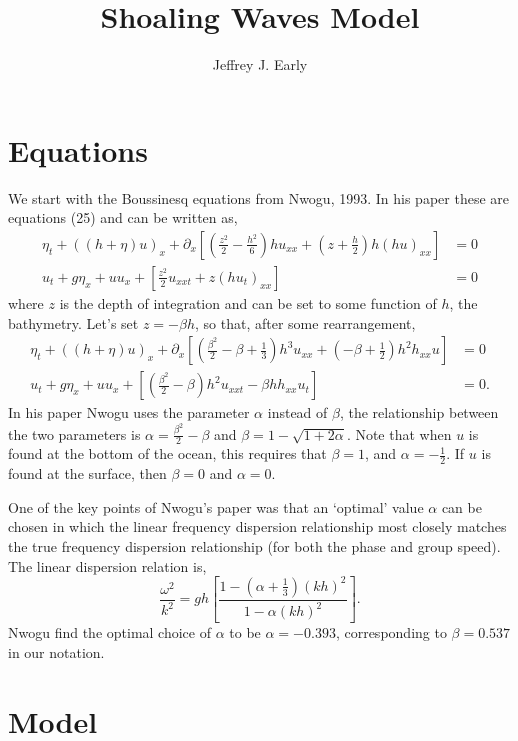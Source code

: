 \documentclass[11pt]{article}
\title{Shoaling Waves Model}
\author{Jeffrey J. Early}
\begin{document}
\maketitle
\section{Equations}
We start with the Boussinesq equations from Nwogu, 1993. In his paper these are equations (25) and can be written as,
\begin{align}
\eta_t + \left( (h+\eta)u\right)_x + \partial_x \left[ \left( \frac{z^2}{2} - \frac{h^2}{6}\right) h u_{xx} + \left(z+\frac{h}{2}\right) h (hu)_{xx} \right] &=0 \\
u_t + g \eta_x + u u_x + \left[ \frac{z^2}{2} u_{xxt} + z (hu_t)_{xx} \right] &= 0
\end{align}
where $z$ is the depth of integration and can be set to some function of $h$, the bathymetry. Let's set $z=-\beta h$, so that, after some rearrangement,
\begin{align}
\eta_t + \left( (h+\eta)u\right)_x + \partial_x \left[ \left( \frac{\beta^2}{2} - \beta + \frac{1}{3} \right) h^3 u_{xx} + \left(-\beta +\frac{1}{2}\right) h^2h_{xx} u  \right] &=0 \\
u_t + g \eta_x + u u_x + \left[ \left( \frac{\beta^2}{2} - \beta \right) h^2 u_{xxt} - \beta h h_{xx} u_t \right] &= 0.
\end{align}
In his paper Nwogu uses the parameter $\alpha$ instead of $\beta$, the relationship between the two parameters is $\alpha = \frac{\beta^2}{2} - \beta$ and $\beta = 1 - \sqrt{1+2\alpha}$. Note that when $u$ is found at the bottom of the ocean, this requires that $\beta =1$, and $\alpha=-\frac{1}{2}$. If $u$ is found at the surface, then $\beta=0$ and $\alpha=0$.

One of the key points of Nwogu's paper was that an `optimal' value $\alpha$ can be chosen in which the linear frequency dispersion relationship most closely matches the true frequency dispersion relationship (for both the phase and group speed). The linear dispersion relation is,
\begin{equation}
\frac{\omega^2}{k^2} = g h \left[ \frac{ 1 - \left(\alpha + \frac{1}{3} \right) (kh)^2}{1 - \alpha(kh)^2} \right].
\end{equation}
Nwogu find the optimal choice of $\alpha$ to be $\alpha = -0.393$, corresponding to $\beta = 0.537$ in our notation.

\section{Model}
\end{document}
